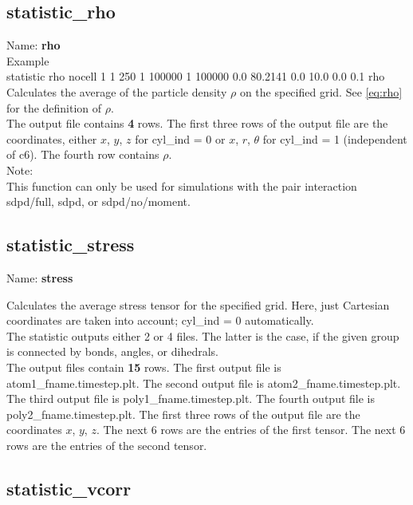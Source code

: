 \subsection{statistic\_rho}

Name: {\bfseries rho}
\\[2ex]
Example\\[0.5ex]
statistic       rho nocell 1 1 250 1 100000 1 100000 0.0 80.2141 0.0 10.0 0.0 0.1 rho
\\[2ex]
Calculates the average of the particle density $\rho$ on the specified grid.
See \cref{eq:rho} for the definition of $\rho$.
\\[2ex]
The output file contains {\bfseries 4} rows.
The first three rows of the output file are the coordinates, either $x$, $y$, $z$ for cyl\_ind = 0 or $x$, $r$, $\theta$ for cyl\_ind = 1 (independent of c6).
The fourth row contains $\rho$.
\\[2ex]
Note:\\
This function can only be used for simulations with the pair interaction sdpd/full, sdpd, or sdpd/no/moment.


\subsection{statistic\_stress}

Name: {\bfseries stress}

Calculates the average stress tensor for the specified grid.
Here, just Cartesian coordinates are taken into account; cyl\_ind = 0 automatically.
\\[2ex]
The statistic outputs either 2 or 4 files.
The latter is the case, if the given group is connected by bonds, angles, or dihedrals.\\
The output files contain {\bfseries 15} rows.
The first output file is \glqq atom1\_fname.timestep.plt\grqq.
The second output file is \glqq atom2\_fname.timestep.plt\grqq.
The third output file is \glqq poly1\_fname.timestep.plt\grqq.
The fourth output file is \glqq poly2\_fname.timestep.plt\grqq.
The first three rows of the output file are the coordinates $x$, $y$, $z$.
The next 6 rows are the entries of the first tensor.
The next 6 rows are the entries of the second tensor.


\subsection{statistic\_vcorr}

